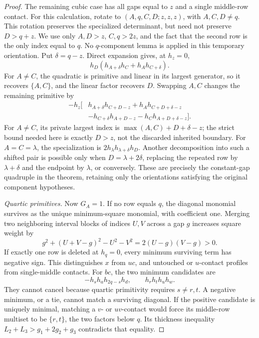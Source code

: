 \documentclass[11pt,a4paper]{amsart}
\numberwithin{equation}{section}
\theoremstyle{plain}
\theoremstyle{definition}
\begin{document}
\begin{proof}
The remaining cubic case has all gaps equal to \(z\) and a single
middle-row contact.  For this calculation, rotate to
\((A,q,C,D;z,z,z)\), with \(A,C,D\ne q\).  This rotation preserves
the specialized determinant, but need not preserve \(D>q+z\).
We use only \(A,D>z\), \(C,q>2z\), and the fact that the
second row is the only index equal to \(q\).  No \(q\)-component
lemma is applied in this temporary orientation.  Put \(\delta=q-z\).  Direct expansion gives, at
\(h_z=0\),
\[
 h_D(h_{A+\delta}h_C+h_Ah_{C+\delta}).
\]
For \(A\ne C\), the quadratic is primitive and linear in its largest
generator, so it recovers \(\{A,C\}\), and the linear factor recovers
\(D\).  Swapping \(A,C\) changes the remaining primitive by
\begin{align*}
-h_z\bigl[&h_{A+\delta}h_{C+D-z}+h_Ah_{C+D+\delta-z}\\
          &-h_{C+\delta}h_{A+D-z}-h_Ch_{A+D+\delta-z}\bigr].
\end{align*}
For \(A\ne C\), its private largest index is
\(\max(A,C)+D+\delta-z\); the strict bound needed here is exactly
\(D>z\), not the discarded inherited boundary.
For \(A=C=\lambda\), the specialization is
\(2h_\lambda h_{\lambda+\delta}h_D\).  Another decomposition into
such a shifted pair is possible only when
\(D=\lambda+2\delta\), replacing the repeated row by
\(\lambda+\delta\) and the endpoint by \(\lambda\), or conversely.
These are precisely the constant-gap quadruple in the theorem, retaining
only the orientations satisfying the original component hypotheses.

\emph{Quartic primitives.}
Now \(G_A=1\).  If no row equals \(q\), the diagonal monomial
survives as the unique minimum-square monomial, with coefficient one.
Merging two neighboring interval blocks of indices \(U,V\) across a
gap \(g\) increases square weight by
\[
 g^2+(U+V-g)^2-U^2-V^2=2(U-g)(V-g)>0.
\]
If exactly one row is deleted at \(h_q=0\), every minimum surviving
term has negative sign.  This distinguishes \(x\) from \(uc\),
and untouched or \(u\)-contact profiles from single-middle contacts.
For \(bc\), the two minimum candidates are
\[
 -h_sh_ah_{2q-s}h_d,\qquad h_rh_th_uh_w.
\]
They cannot cancel because quartic primitivity requires \(s\ne r,t\).
A negative minimum, or a tie, cannot match a surviving diagonal.
If the positive candidate is uniquely minimal, matching a \(v\)- or
\(uv\)-contact would force its middle-row multiset to be \(\{r,t\}\),
the two factors below \(q\).  Its thickness inequality
\(L_2+L_3>g_1+2g_2+g_3\) contradicts that equality.


\end{proof}
\end{document}
